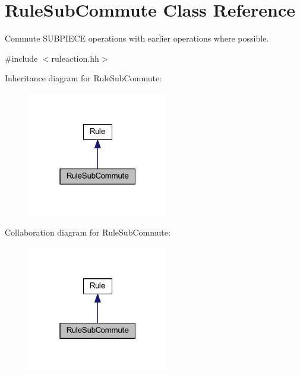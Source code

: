 \hypertarget{class_rule_sub_commute}{}\section{Rule\+Sub\+Commute Class Reference}
\label{class_rule_sub_commute}


Commute S\+U\+B\+P\+I\+E\+CE operations with earlier operations where possible.  




{\ttfamily \#include $<$ruleaction.\+hh$>$}



Inheritance diagram for Rule\+Sub\+Commute\+:
\nopagebreak
\begin{figure}[H]
\begin{center}
\leavevmode
\includegraphics[width=175pt]{class_rule_sub_commute__inherit__graph}
\end{center}
\end{figure}


Collaboration diagram for Rule\+Sub\+Commute\+:
\nopagebreak
\begin{figure}[H]
\begin{center}
\leavevmode
\includegraphics[width=175pt]{class_rule_sub_commute__coll__graph}
\end{center}
\end{figure}
